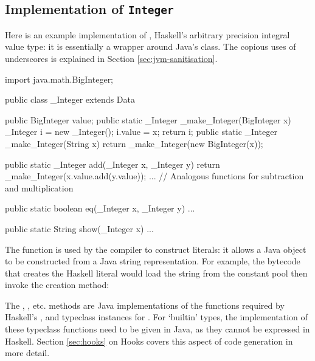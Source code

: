 \documentclass[dissertation.tex]{subfiles}
\begin{document}
\begin{appendices}
\chapter{Implementation of \texttt{Integer}}\label{appendix:integer-literal}
{
    Here is an example implementation of , Haskell's arbitrary precision integral value type: it is essentially a wrapper around Java's  class. The copious uses of underscores is explained in Section \ref{sec:jvm-sanitisation}.

    \begin{javafigure}
    import java.math.BigInteger;

    public class _Integer extends Data {
        public BigInteger value;
        public static _Integer _make_Integer(BigInteger x) {
            _Integer i = new _Integer();
            i.value = x;
            return i;
        }
        public static _Integer _make_Integer(String x) {
            return _make_Integer(new BigInteger(x));
        }

        public static _Integer add(_Integer x, _Integer y) {
            return _make_Integer(x.value.add(y.value));
        }
        ... // Analogous functions for subtraction and multiplication

        public static boolean eq(_Integer x, _Integer y) { ... }

        public static String show(_Integer x) { ... }
    }
    \end{javafigure}

    The  function is used by the compiler to construct  literals: it allows a Java  object to be constructed from a Java string representation. For example, the bytecode that creates the Haskell literal  would load the string  from the constant pool then invoke the creation method:


    The , , etc. methods are Java implementations of the functions required by Haskell's ,  and  typeclass instances for . For `builtin' types, the implementation of these typeclass functions need to be given in Java, as they cannot be expressed in Haskell. Section \ref{sec:hooks} on Hooks covers this aspect of code generation in more detail.
}

\end{appendices}
\end{document}
